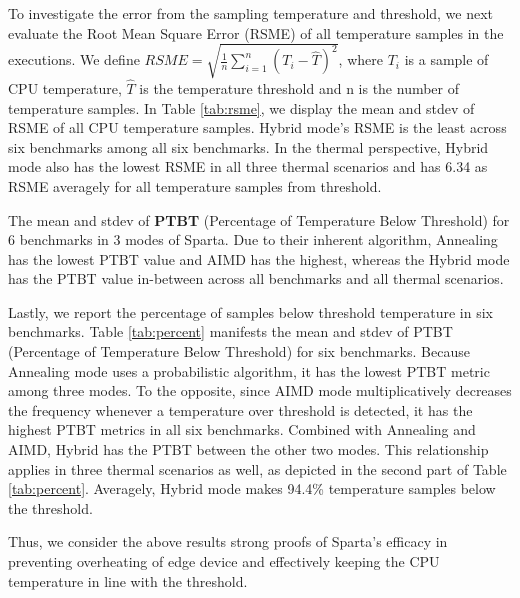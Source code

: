 To investigate the error from the sampling temperature and threshold, we next evaluate the Root Mean Square Error (RSME) of all temperature samples in the executions. We define $RSME = \sqrt{\frac{1}{n}\sum_{i=1}^{n}(T_i - \hat{T})^2}$, where $T_i$ is a sample of CPU temperature, $\hat{T}$ is the temperature threshold and n is the number of temperature samples. In Table \ref{tab:rsme}, we display the mean and stdev of RSME of all CPU temperature samples. Hybrid mode's RSME is the least across six benchmarks among all six benchmarks. In the thermal perspective, Hybrid mode also has the lowest RSME in all three thermal scenarios and has 6.34 as RSME averagely for all temperature samples from threshold. 


\begin{table}[t]
\caption{The mean and stdev of \textbf{PTBT} (Percentage of Temperature Below Threshold) for 6 benchmarks in 3 modes of Sparta. Due to their inherent algorithm, Annealing has the lowest PTBT value and AIMD has the highest, whereas the Hybrid mode has the PTBT value in-between across all benchmarks and all thermal scenarios.}\label{tab:percent}
\vspace{1mm}
\centering
\resizebox{350pt}{!}{}
\newline
\vspace{3mm}
\newline
\resizebox{350pt}{!}{}
\end{table}


Lastly, we report the percentage of samples below threshold temperature in six benchmarks. Table \ref{tab:percent} manifests the mean and stdev of PTBT (Percentage of Temperature Below Threshold) for six benchmarks. Because Annealing mode uses a probabilistic algorithm, it has the lowest PTBT metric among three modes. To the opposite, since AIMD mode multiplicatively decreases the frequency whenever a temperature over threshold is detected, it has the highest PTBT metrics in all six benchmarks. Combined with Annealing and AIMD, Hybrid has the PTBT between the other two modes. This relationship applies in three thermal scenarios as well, as depicted in the second part of Table \ref{tab:percent}. Averagely, Hybrid mode makes 94.4\% temperature samples below the threshold.

Thus, we consider the above results strong proofs of Sparta's efficacy in preventing overheating of edge device and effectively keeping the CPU temperature in line with the threshold.  





